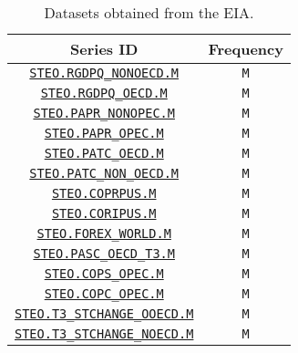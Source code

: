 \begin{table}
\begin{center}
\begin{tabular}{|c|c|}
\hline
\textbf{Series ID} & \textbf{Frequency} \\ \hline
\href{https://www.eia.gov/opendata/qb.php?sdid=STEO.RGDPQ_NONOECD.M}{\texttt{STEO.RGDPQ\_NONOECD.M}} & \texttt{M} \\  \hline
\href{https://www.eia.gov/opendata/qb.php?sdid=STEO.RGDPQ_OECD.M}{\texttt{STEO.RGDPQ\_OECD.M}} & \texttt{M} \\  \hline
\href{https://www.eia.gov/opendata/qb.php?sdid=STEO.PAPR_NONOPEC.M}{\texttt{STEO.PAPR\_NONOPEC.M}} & \texttt{M} \\  \hline
\href{https://www.eia.gov/opendata/qb.php?sdid=STEO.PAPR_OPEC.M}{\texttt{STEO.PAPR\_OPEC.M}} & \texttt{M} \\  \hline
\href{https://www.eia.gov/opendata/qb.php?sdid=STEO.PATC_OECD.M}{\texttt{STEO.PATC\_OECD.M}} & \texttt{M}  \\ \hline
\href{https://www.eia.gov/opendata/qb.php?sdid=STEO.PATC_NON_OECD.M}{\texttt{STEO.PATC\_NON\_OECD.M}} & \texttt{M} \\  \hline
\href{https://www.eia.gov/opendata/qb.php?sdid=STEO.COPRPUS.M}{\texttt{STEO.COPRPUS.M}} & \texttt{M} \\  \hline
\href{https://www.eia.gov/opendata/qb.php?sdid=STEO.CORIPUS.M}{\texttt{STEO.CORIPUS.M}} & \texttt{M} \\  \hline
\href{https://www.eia.gov/opendata/qb.php?sdid=STEO.FOREX_WORLD.M}{\texttt{STEO.FOREX\_WORLD.M}} & \texttt{M} \\  \hline
\href{https://www.eia.gov/opendata/qb.php?sdid=STEO.PASC_OECD_T3.M}{\texttt{STEO.PASC\_OECD\_T3.M}} & \texttt{M} \\  \hline
\href{https://www.eia.gov/opendata/qb.php?sdid=STEO.COPS_OPEC.M}{\texttt{STEO.COPS\_OPEC.M}} & \texttt{M} \\  \hline
\href{https://www.eia.gov/opendata/qb.php?sdid=STEO.COPC_OPEC.M}{\texttt{STEO.COPC\_OPEC.M}} & \texttt{M} \\  \hline
\href{https://www.eia.gov/opendata/qb.php?sdid=STEO.T3_STCHANGE_OOECD.M}{\texttt{STEO.T3\_STCHANGE\_OOECD.M}} & \texttt{M} \\  \hline
\href{https://www.eia.gov/opendata/qb.php?sdid=STEO.T3_STCHANGE_NOECD.M}{\texttt{STEO.T3\_STCHANGE\_NOECD.M}} & \texttt{M} \\  \hline

\end{tabular}
\end{center}
\caption{Datasets obtained from the EIA.}
\end{table}

